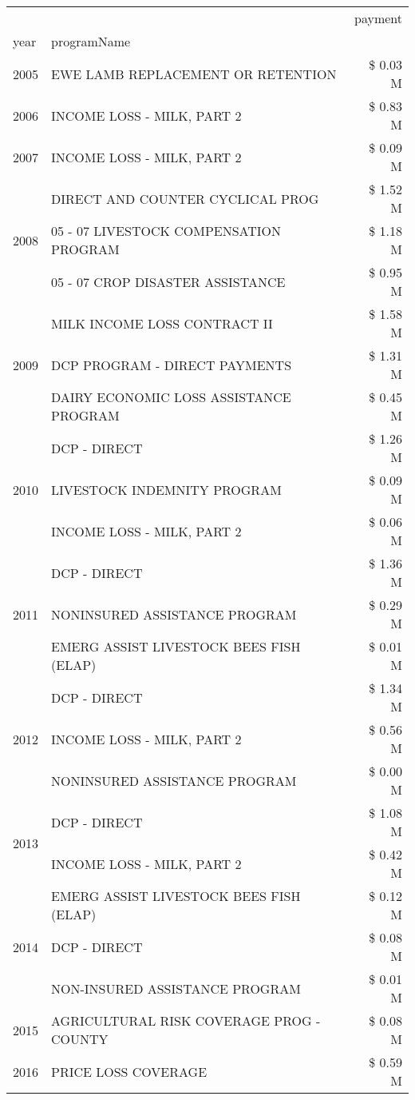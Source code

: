 \begin{tabular}{llr}
\toprule
 &  & payment \\
year & programName &  \\
\midrule
2005 & EWE LAMB REPLACEMENT OR RETENTION & \$ 0.03 M \\
\cline{1-3}
2006 & INCOME LOSS - MILK, PART 2 & \$ 0.83 M \\
\cline{1-3}
2007 & INCOME LOSS - MILK, PART 2 & \$ 0.09 M \\
\cline{1-3}
\multirow[t]{3}{*}{2008} & DIRECT AND COUNTER CYCLICAL PROG & \$ 1.52 M \\
 & 05 - 07 LIVESTOCK COMPENSATION PROGRAM & \$ 1.18 M \\
 & 05 - 07 CROP DISASTER ASSISTANCE & \$ 0.95 M \\
\cline{1-3}
\multirow[t]{3}{*}{2009} & MILK INCOME LOSS CONTRACT II & \$ 1.58 M \\
 & DCP PROGRAM - DIRECT PAYMENTS & \$ 1.31 M \\
 & DAIRY ECONOMIC LOSS ASSISTANCE PROGRAM & \$ 0.45 M \\
\cline{1-3}
\multirow[t]{3}{*}{2010} & DCP - DIRECT & \$ 1.26 M \\
 & LIVESTOCK INDEMNITY PROGRAM & \$ 0.09 M \\
 & INCOME LOSS - MILK, PART 2 & \$ 0.06 M \\
\cline{1-3}
\multirow[t]{3}{*}{2011} & DCP - DIRECT & \$ 1.36 M \\
 & NONINSURED ASSISTANCE PROGRAM & \$ 0.29 M \\
 & EMERG ASSIST LIVESTOCK BEES FISH (ELAP) & \$ 0.01 M \\
\cline{1-3}
\multirow[t]{3}{*}{2012} & DCP - DIRECT & \$ 1.34 M \\
 & INCOME LOSS - MILK, PART 2 & \$ 0.56 M \\
 & NONINSURED ASSISTANCE PROGRAM & \$ 0.00 M \\
\cline{1-3}
\multirow[t]{2}{*}{2013} & DCP - DIRECT & \$ 1.08 M \\
 & INCOME LOSS - MILK, PART 2 & \$ 0.42 M \\
\cline{1-3}
\multirow[t]{3}{*}{2014} & EMERG ASSIST LIVESTOCK BEES FISH (ELAP) & \$ 0.12 M \\
 & DCP - DIRECT & \$ 0.08 M \\
 & NON-INSURED ASSISTANCE PROGRAM & \$ 0.01 M \\
\cline{1-3}
2015 & AGRICULTURAL RISK COVERAGE PROG - COUNTY & \$ 0.08 M \\
\cline{1-3}
\multirow[t]{3}{*}{2016} & PRICE LOSS COVERAGE & \$ 0.59 M \\

\end{tabular}
